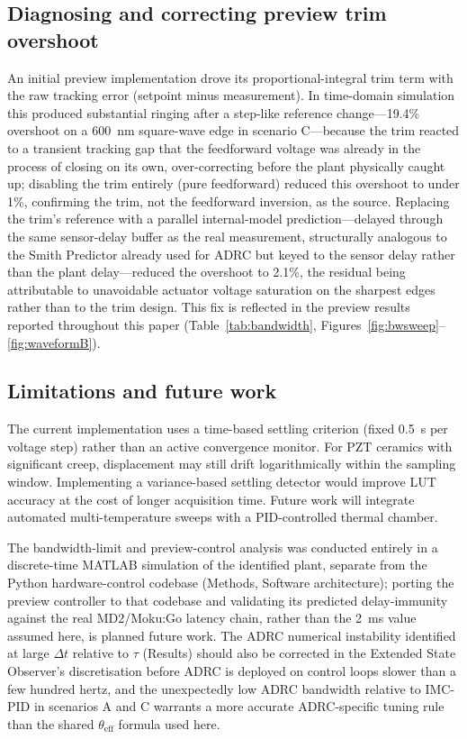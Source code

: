 \documentclass[fleqn,10pt]{wlscirep}
\begin{document}
\subsection*{Diagnosing and correcting preview trim overshoot}

An initial preview implementation drove its proportional-integral trim term with the raw tracking error (setpoint minus measurement). In time-domain simulation this produced substantial ringing after a step-like reference change---19.4\% overshoot on a \SI{600}{nm} square-wave edge in scenario C---because the trim reacted to a transient tracking gap that the feedforward voltage was already in the process of closing on its own, over-correcting before the plant physically caught up; disabling the trim entirely (pure feedforward) reduced this overshoot to under 1\%, confirming the trim, not the feedforward inversion, as the source. Replacing the trim's reference with a parallel internal-model prediction---delayed through the same sensor-delay buffer as the real measurement, structurally analogous to the Smith Predictor already used for ADRC but keyed to the sensor delay rather than the plant delay---reduced the overshoot to 2.1\%, the residual being attributable to unavoidable actuator voltage saturation on the sharpest edges rather than to the trim design. This fix is reflected in the preview results reported throughout this paper (Table~\ref{tab:bandwidth}, Figures~\ref{fig:bwsweep}--\ref{fig:waveformB}).

\subsection*{Limitations and future work}

The current implementation uses a time-based settling criterion (fixed \SI{0.5}{s} per voltage step) rather than an active convergence monitor. For PZT ceramics with significant creep, displacement may still drift logarithmically within the sampling window. Implementing a variance-based settling detector would improve LUT accuracy at the cost of longer acquisition time. Future work will integrate automated multi-temperature sweeps with a PID-controlled thermal chamber.

The bandwidth-limit and preview-control analysis was conducted entirely in a discrete-time MATLAB simulation of the identified plant, separate from the Python hardware-control codebase (Methods, Software architecture); porting the preview controller to that codebase and validating its predicted delay-immunity against the real \textmu MD2/Moku:Go latency chain, rather than the \SI{2}{ms} value assumed here, is planned future work. The ADRC numerical instability identified at large $\Delta t$ relative to $\tau$ (Results) should also be corrected in the Extended State Observer's discretisation before ADRC is deployed on control loops slower than a few hundred hertz, and the unexpectedly low ADRC bandwidth relative to IMC-PID in scenarios A and C warrants a more accurate ADRC-specific tuning rule than the shared $\theta_\text{eff}$ formula used here.
\end{document}
